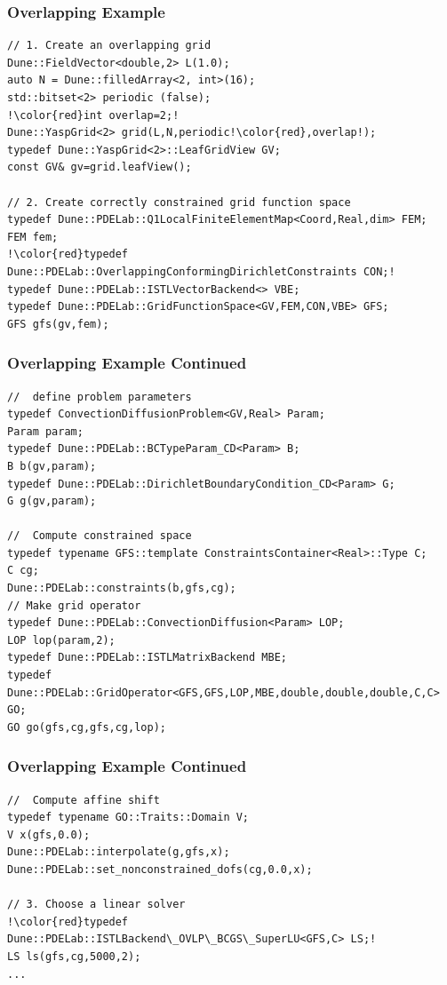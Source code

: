 \documentclass[aspectratio=169,11pt]{beamer}
\theoremstyle{definition}
\begin{document}
\begin{frame}[fragile]
  \frametitle{Overlapping Example}
  \begin{lstlisting}[breaklines=true,escapechar=!]
// 1. Create an overlapping grid
Dune::FieldVector<double,2> L(1.0);
auto N = Dune::filledArray<2, int>(16);
std::bitset<2> periodic (false);
!\color{red}int overlap=2;!
Dune::YaspGrid<2> grid(L,N,periodic!\color{red},overlap!);
typedef Dune::YaspGrid<2>::LeafGridView GV;
const GV& gv=grid.leafView();

// 2. Create correctly constrained grid function space
typedef Dune::PDELab::Q1LocalFiniteElementMap<Coord,Real,dim> FEM;
FEM fem;
!\color{red}typedef Dune::PDELab::OverlappingConformingDirichletConstraints CON;!
typedef Dune::PDELab::ISTLVectorBackend<> VBE;
typedef Dune::PDELab::GridFunctionSpace<GV,FEM,CON,VBE> GFS;
GFS gfs(gv,fem);
\end{lstlisting}
\end{frame}
\begin{frame}[fragile]
\frametitle<presentation>{Overlapping Example Continued}
  \begin{lstlisting}[breaklines=true]
//  define problem parameters
typedef ConvectionDiffusionProblem<GV,Real> Param;
Param param;
typedef Dune::PDELab::BCTypeParam_CD<Param> B;
B b(gv,param);
typedef Dune::PDELab::DirichletBoundaryCondition_CD<Param> G;
G g(gv,param);

//  Compute constrained space
typedef typename GFS::template ConstraintsContainer<Real>::Type C;
C cg;
Dune::PDELab::constraints(b,gfs,cg);
// Make grid operator
typedef Dune::PDELab::ConvectionDiffusion<Param> LOP;
LOP lop(param,2);
typedef Dune::PDELab::ISTLMatrixBackend MBE;
typedef Dune::PDELab::GridOperator<GFS,GFS,LOP,MBE,double,double,double,C,C> GO;
GO go(gfs,cg,gfs,cg,lop);
\end{lstlisting}
\end{frame}
\begin{frame}[fragile]
\frametitle<presentation>{Overlapping Example Continued}
  \begin{lstlisting}[breaklines=true,escapechar=!]
//  Compute affine shift
typedef typename GO::Traits::Domain V;
V x(gfs,0.0);
Dune::PDELab::interpolate(g,gfs,x);
Dune::PDELab::set_nonconstrained_dofs(cg,0.0,x);

// 3. Choose a linear solver
!\color{red}typedef Dune::PDELab::ISTLBackend\_OVLP\_BCGS\_SuperLU<GFS,C> LS;!
LS ls(gfs,cg,5000,2);
...
\end{lstlisting}
\end{frame}
\end{document}
